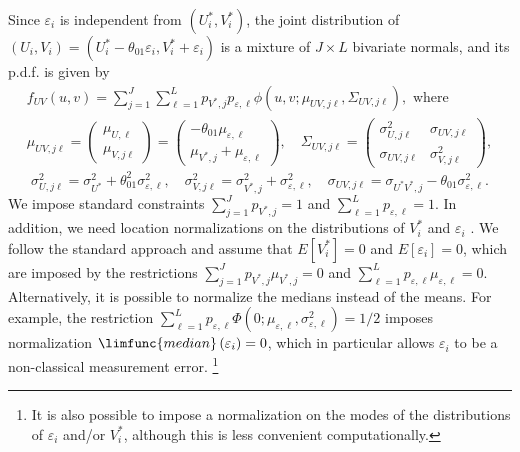 \documentclass[12pt]{article}
\begin{document}
Since $\varepsilon _{i}$ is independent from $\left( U_{i}^{\ast
},V_{i}^{\ast }\right) $, the joint distribution of $\left(
U_{i},V_{i}\right) =\left( U_{i}^{\ast }-\theta _{01}\varepsilon
_{i},V_{i}^{\ast }+\varepsilon _{i}\right) $ is a mixture of $J\times L$
bivariate normals, and its p.d.f. is given by 
\begin{gather*}
f_{UV}(u,v)=\sum_{j=1}^{J}\sum_{\ell =1}^{L}p_{V^{\ast },j}p_{\varepsilon
,\ell }\phi (u,v;\mu _{UV,j\ell },\Sigma _{UV,j\ell }),\text{ where} \\
\mu _{UV,j\ell }=%
\begin{pmatrix}
\mu _{U,\ell } \\ 
\mu _{V,j\ell }%
\end{pmatrix}%
=%
\begin{pmatrix}
-\theta _{01}\mu _{\varepsilon ,\ell } \\ 
\mu _{V^{\ast },j}+\mu _{\varepsilon ,\ell }%
\end{pmatrix}%
,\quad \Sigma _{UV,j\ell }=%
\begin{pmatrix}
\sigma _{U,j\ell }^{2} & \sigma _{UV,j\ell } \\ 
\sigma _{UV,j\ell } & \sigma _{V,j\ell }^{2}%
\end{pmatrix}%
,
\end{gather*}%
\begin{equation}
\sigma _{U,j\ell }^{2}=\sigma _{U^{\ast }}^{2}+\theta _{01}^{2}\sigma
_{\varepsilon ,\ell }^{2},\quad \sigma _{V,j\ell }^{2}=\sigma _{V^{\ast
},j}^{2}+\sigma _{\varepsilon ,\ell }^{2},\quad \sigma _{UV,j\ell }=\sigma
_{U^{\ast }V^{\ast },j}-\theta _{01}\sigma _{\varepsilon ,\ell }^{2}.
\label{eq:general reduced form to structural relationship}
\end{equation}%
We impose standard constraints $\sum_{j=1}^{J}p_{V^{\ast },j}=1$ and $%
\sum_{\ell =1}^{L}p_{\varepsilon ,\ell }=1$. In addition, we need location
normalizations on the distributions of $V_{i}^{\ast }$ and $\varepsilon _{i}$%
. We follow the standard approach and assume that $E\left[ V_{i}^{\ast }%
\right] =0$ and $E\left[ \varepsilon _{i}\right] =0$, which are imposed by
the restrictions $\sum_{j=1}^{J}p_{V^{\ast },j}\mu _{V^{\ast },j}=0$ and $%
\sum_{\ell =1}^{L}p_{\varepsilon ,\ell }\mu _{\varepsilon ,\ell }=0$.
Alternatively, it is possible to normalize the medians instead of the means.
For example, the restriction $\sum_{\ell =1}^{L}p_{\varepsilon ,\ell }\Phi
(0;\mu _{\varepsilon ,\ell },\sigma _{\varepsilon ,\ell }^{2})=1/2$ imposes
normalization $\limfunc{median}\left( \varepsilon _{i}\right) =0$, which in
particular allows $\varepsilon _{i}$ to be a non-classical measurement error.%
\footnote{%
It is also possible to impose a normalization on the modes of the
distributions of $\varepsilon _{i}$ and/or $V_{i}^{\ast }$, although this is
less convenient computationally.} {}
\end{document}
